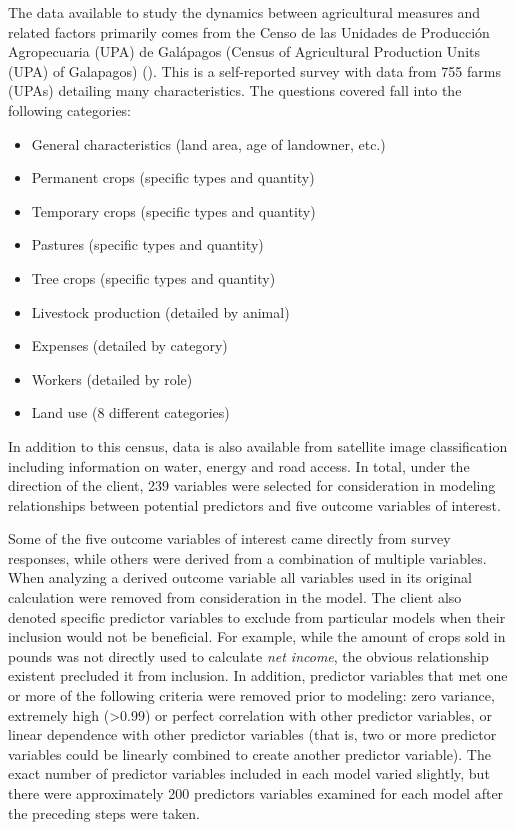 \documentclass{article}
\begin{document}
The data available to study the dynamics between agricultural measures and related factors primarily 
comes from the Censo de las Unidades de Producci\'on Agropecuaria (UPA) de Gal\'apagos (Census of Agricultural Production 
Units (UPA) of Galapagos) (\cite{census}). This is a self-reported survey with data from 755 farms (UPAs) detailing many characteristics. The questions covered fall into the following categories:
\begin{itemize}
\item{General characteristics (land area, age of landowner, etc.)}
\item{Permanent crops (specific types and quantity)}
\item{Temporary crops (specific types and quantity)}
\item{Pastures (specific types and quantity)}
\item{Tree crops (specific types and quantity)}
\item{Livestock production (detailed by animal)}
\item{Expenses (detailed by category)}
\item{Workers (detailed by role)}
\item{Land use (8 different categories)}

\end{itemize}

In addition to this census, data is also available from satellite image classification including 
information on water, energy and road access. In total, under the direction of the client, 239 variables were selected for 
consideration in modeling relationships between potential predictors and five outcome variables of interest. 

Some of the five outcome variables of interest came directly from survey responses, while others were derived from a 
combination of multiple variables. When analyzing a derived outcome variable all variables used in its original calculation were 
removed from consideration in the model. The client also denoted specific predictor variables to exclude from particular 
models when their inclusion would not be beneficial. For example, while the 
amount of crops sold in pounds was not directly used to calculate \textit{net income}, the obvious relationship existent 
precluded it from inclusion. In addition, predictor variables that met one or more of the following criteria were removed prior to 
modeling: zero variance, extremely high (>0.99) or perfect correlation with other predictor variables, or linear dependence with 
other predictor variables (that is, two or more predictor variables could be linearly combined to create another predictor variable). The 
exact number of predictor variables included in each model varied slightly, but there were approximately 200 predictors variables examined for each model after the preceding steps were taken.
\end{document}
